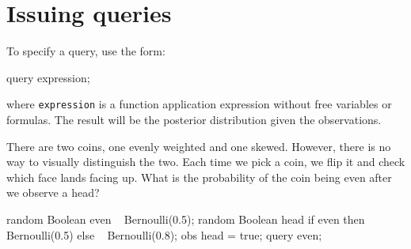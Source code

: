 \documentclass[12pt]{article}
\begin{document}
\section{Issuing queries}
To specify a query, use the form:
\begin{blogcode}
query expression;
\end{blogcode}
where \texttt{expression} is a function application expression without free variables or formulas. The result will be the posterior distribution given the observations. 

\begin{example}
There are two coins, one evenly weighted and one skewed. However, there is no way to visually distinguish the two. Each time we pick a coin, we flip it and check which face lands facing up. What is the probability of the coin being even after we observe a head?
\end{example}
\begin{blogcode}
random Boolean even ~ Bernoulli(0.5);
random Boolean head 
  if even then ~ Bernoulli(0.5)
  else ~ Bernoulli(0.8);
obs head = true;
query even;
\end{blogcode}
\end{document}
